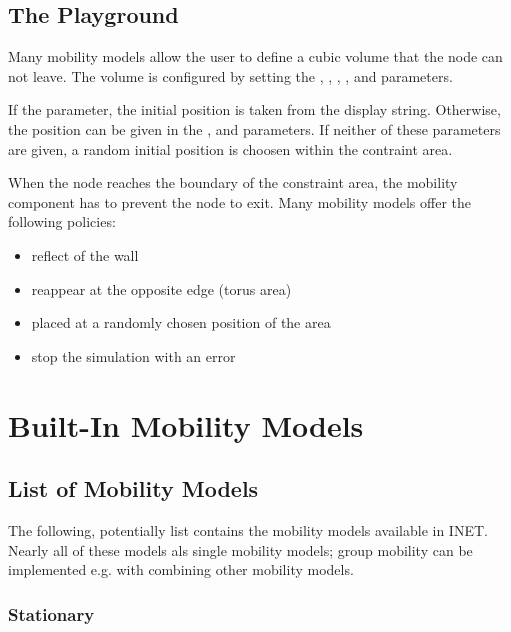 \subsection*{The Playground}

Many mobility models allow the user to define a cubic volume that the node
can not leave. The volume is configured by setting the ,
, ,
,  and
 parameters.

If the  parameter, the initial position is taken from
the display string. Otherwise, the position can be given in the ,
 and  parameters. If neither of these parameters
are given, a random initial position is choosen within the contraint area.

When the node reaches the boundary of the constraint area, the mobility
component has to prevent the node to exit. Many mobility models offer the
following policies:

\begin{itemize}
  \item reflect of the wall
  \item reappear at the opposite edge (torus area)
  \item placed at a randomly chosen position of the area
  \item stop the simulation with an error
\end{itemize}


\section{Built-In Mobility Models}
\label{sec:mobility:built-in-mobility-models}

\subsection{List of Mobility Models}
\label{sec:mobility:list-of-mobility-models}

The following, potentially list contains the mobility models available in INET.
Nearly all of these models als single mobility models; group mobility can be
implemented e.g. with combining other mobility models.

\subsubsection*{Stationary}

